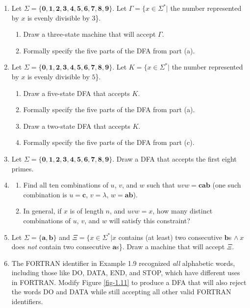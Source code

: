 \begin{enumerate}[{1.}1.]
\item Let $\Sigma=\{\pmb{0},\pmb{1},\pmb{2},\pmb{3},\pmb{4},\pmb{5},\pmb{6},
\pmb{7},\pmb{8},\pmb{9}\}$. Let $\Gamma=\{x\in \Sigma^*|$ the number represented
by $x$ is evenly divisible by $3$\}.
\begin{enumerate}
\item Draw a three-state machine that will accept $\Gamma$.
\item Formally specify the five parts of the DFA from part (a).
\end{enumerate}

\item Let $\Sigma=\{\pmb{0},\pmb{1},\pmb{2},\pmb{3},\pmb{4},\pmb{5},\pmb{6},
\pmb{7},\pmb{8},\pmb{9}\}$. Let $K=\{x\in \Sigma^*|$ the number represented by
$x$ is evenly divisible by $5$\}.
\begin{enumerate}
\item Draw a five-state DFA that accepts $K$.
\item Formally specify the five parts of the DFA from part (a).
\item Draw a two-state DFA that accepts $K$.
\item Formally specify the five parts of the DFA from part (c).
\end{enumerate}

\item Let $\Sigma=\{\pmb{0},\pmb{1},\pmb{2},\pmb{3},\pmb{4},\pmb{5},\pmb{6},
\pmb{7},\pmb{8},\pmb{9}\}$. Draw a DFA that accepts the first eight primes.

\item \begin{enumerate}
\item Find all ten combinations of $u$, $v$, and $w$ such
that $uvw=\pmb{cab}$ (one such combination is $u=\pmb{c}$, $v=\lambda$,
$w=\pmb{ab}$).
\item In general, if $x$ is of length $n$, and $uvw = x$, how many distinct
combinations of $u$, $v$, and $w$ will satisfy this constraint?
\end{enumerate}

\item Let $\Sigma = \{\pmb{a},\pmb{b}\}$ and $\Xi =\{x \in \Sigma^*|x$ contains
(at least) two consecutive $\pmb{b}$s $\wedge\ x$ does \emph{not} contain two
consecutive $\pmb{a}$s\}. Draw a machine that will accept $\Xi$.

\item The FORTRAN identifier in Example 1.9 recognized \emph{all} alphabetic
words, including those like DO, DATA, END, and STOP, which have different uses
in FORTRAN. Modify Figure \ref{fig-1.11} to produce a DFA that will also reject
the words DO and DATA while still accepting all other valid FORTRAN identifiers.


\end{enumerate}

